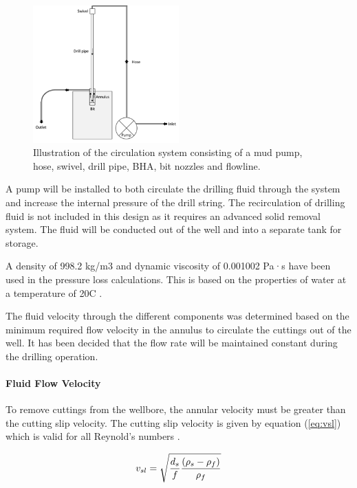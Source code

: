 \begin{figure} [H]
\centering
\includegraphics[width=0.5\textwidth]{figures/fluidsystem.png}
\caption{Illustration of the circulation system consisting of a mud pump, hose, swivel, drill pipe, BHA, bit nozzles and flowline.}
\label{fig:fluidsystem}
\end{figure}

A pump will be installed to both circulate the drilling fluid through the system and increase the internal pressure of the drill string. The recirculation of drilling fluid is not included in this design as it requires an advanced solid removal system. The fluid will be conducted out of the well and into a separate tank for storage. 

A density of 998.2 kg/m3 and dynamic viscosity of 0.001002 Pa·s have been used in the pressure loss calculations. This is based on the properties of water at a temperature of 20\degree C \cite{engtool}.

The fluid velocity through the different components was determined based on the minimum required flow velocity in the annulus to circulate the cuttings out of the well. It has been decided that the flow rate will be maintained constant during the drilling operation.

\paragraph{Fluid Flow Velocity}
To remove cuttings from the wellbore, the annular velocity must be greater than the cutting slip velocity. The cutting slip velocity is given by equation (\ref{eq:vsl}) which is valid for all Reynold’s numbers \cite{bourg}.

\begin{equation}
\centering
   v_{sl}= \sqrt{\frac{d_s}{f} \frac{(\rho_s-\rho_f)}{\rho_f}}
\label{eq:vsl}
\end{equation}

